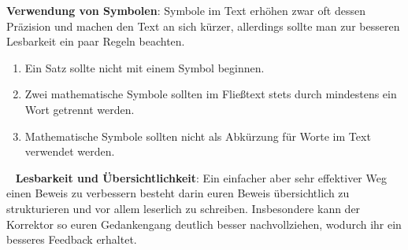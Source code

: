 \textbf{Verwendung von Symbolen}:\newline
Symbole im Text erhöhen zwar oft dessen Präzision und machen den Text an sich kürzer, allerdings sollte man zur besseren Lesbarkeit ein paar Regeln beachten.
\begin{enumerate}
    \item 
    Ein Satz sollte nicht mit einem Symbol beginnen. 
    \item
    Zwei mathematische Symbole sollten im Fließtext stets durch mindestens ein Wort getrennt werden. 
    \item 
    Mathematische Symbole sollten nicht als Abkürzung für Worte im Text verwendet werden. 
\end{enumerate}\
\newline
\textbf{Lesbarkeit und Übersichtlichkeit}: \newline 
Ein einfacher aber sehr effektiver Weg einen Beweis zu verbessern besteht darin euren Beweis übersichtlich zu strukturieren und vor allem leserlich zu schreiben. 
Insbesondere kann der Korrektor so euren Gedankengang deutlich besser nachvollziehen, wodurch ihr ein besseres Feedback erhaltet.






